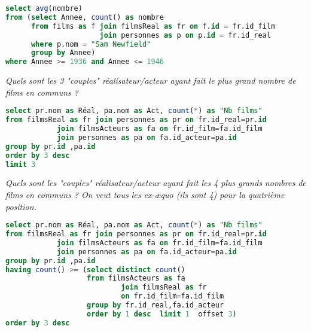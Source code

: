 \begin{Answer}
\begin{lstlisting}[language=SQL]
select avg(nombre)
from (select Annee, count() as nombre
      from films as f join filmsReal as fr on f.id = fr.id_film
                      join personnes as p on p.id = fr.id_real
      where p.nom = "Sam Newfield"
      group by Annee)
where Annee >= 1936 and Annee <= 1946
\end{lstlisting}
\end{Answer}
\begin{Exercise} \it Quels sont les 3 "couples" réalisateur/acteur ayant fait le plus grand nombre de films en communs ?
\end{Exercise}
\begin{Answer}
\begin{lstlisting}[language=SQL]
select pr.nom as Réal, pa.nom as Act, count(*) as "Nb films"
from filmsReal as fr join personnes as pr on fr.id_real=pr.id
            join filmsActeurs as fa on fr.id_film=fa.id_film 
            join personnes as pa on fa.id_acteur=pa.id
group by pr.id ,pa.id
order by 3 desc
limit 3
\end{lstlisting}
\newpage
\end{Answer}
\begin{Exercise}[difficulty = 2] \it Quels sont les "couples" réalisateur/acteur ayant fait les 4 plus grands nombres de films en communs ?
On veut tous les ex-æquo (ils sont 4) pour la quatrième position.
\end{Exercise}
\begin{Answer}
\begin{lstlisting}[language=SQL]
select pr.nom as Réal, pa.nom as Act, count(*) as "Nb films"
from filmsReal as fr join personnes as pr on fr.id_real=pr.id
            join filmsActeurs as fa on fr.id_film=fa.id_film 
            join personnes as pa on fa.id_acteur=pa.id
group by pr.id ,pa.id
having count() >= (select distinct count()
                   from filmsActeurs as fa 
                           join filmsReal as fr 
                           on fr.id_film=fa.id_film 
                   group by fr.id_real,fa.id_acteur				   
                   order by 1 desc  limit 1  offset 3)
order by 3 desc
\end{lstlisting}
\end{Answer}
